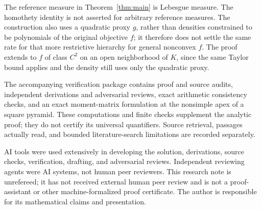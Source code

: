 \documentclass[11pt]{article}
\begin{document}
The reference measure in Theorem~\ref{thm:main} is Lebesgue measure.
The homothety identity is not asserted for arbitrary reference
measures. The construction also uses a quadratic proxy $g$, rather
than densities constrained to be polynomials of the original
objective $f$; it therefore does not settle the same rate for that
more restrictive hierarchy for general nonconvex $f$.
The proof extends to $f$ of class $C^2$ on an open neighborhood of
$K$, since the same Taylor bound applies and the density still uses
only the quadratic proxy.

The accompanying verification package contains proof and source
audits, independent derivations and adversarial reviews, exact
arithmetic consistency checks, and an exact moment-matrix formulation
at the nonsimple apex of a square pyramid. These computations
and finite checks supplement the analytic proof; they do not certify
its universal quantifiers. Source retrieval, passages actually read,
and bounded literature-search limitations are recorded separately.

AI tools were used extensively in developing the solution,
derivations, source checks, verification, drafting, and adversarial
reviews. Independent reviewing agents were AI systems, not human
peer reviewers. This research note is unrefereed; it has not received
external human peer review and is not a proof-assistant or other
machine-formalized proof certificate. The author is responsible for
its mathematical claims and presentation.
\end{document}
